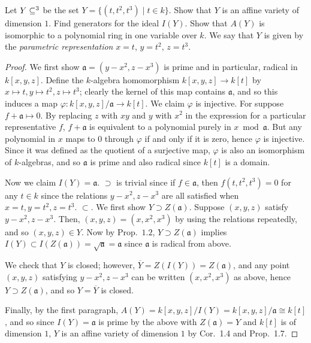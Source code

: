 \documentclass[10pt]{article}
\theoremstyle{definition}
\theoremstyle{remark}
\numberwithin{equation}{section}
\numberwithin{figure}{subsubsection}
\let\AA\relax
\DeclareMathOperator{\AA}{\mathbf{A}}
\begin{document}
\begin{problem}
  Let $Y \subseteq \AA^3$ be the set $Y = \{(t,t^2,t^3) \mid t \in k\}$.
  Show that $Y$ is an affine variety of dimension $1$.
  Find generators for the ideal $I(Y)$.
  Show that $A(Y)$ is isomorphic to a polynomial ring in one variable over $k$.
  We say that $Y$ is given by the \emph{parametric representation} $x =t$,
  $y = t^2$, $z = t^3$.
\end{problem}
\begin{proof}
  We first show $\mathfrak{a} = (y - x^2,z - x^3)$ is prime and in particular,
  radical in $k[x,y,z]$. Define the $k$-algebra homomorphism
  $k[x,y,z] \to k[t]$ by $x \mapsto t,y\mapsto t^2,z \mapsto t^3$; clearly the
  kernel of this map contains $\mathfrak{a}$, and so this induces a map
  $\varphi\colon k[x,y,z]/\mathfrak{a} \to k[t]$.
  We claim $\varphi$ is injective. For suppose $f +\mathfrak{a} \mapsto 0$.
  By replacing $z$ with $xy$ and $y$ with $x^2$ in the expression for a
  particular representative $f$, $f + \mathfrak{a}$ is equivalent to a
  polynomial purely in $x\bmod\mathfrak{a}$.
  But any polynomial in $x$ maps to $0$ through $\varphi$ if and only if it is
  zero, hence $\varphi$ is injective.
  Since it was defined as the quotient of a surjective map, $\varphi$ is also
  an isomorphism of $k$-algebras, and so $\mathfrak{a}$ is prime and also
  radical since $k[t]$ is a domain.
  \par Now we claim $I(Y) = \mathfrak{a}$.
  $\supset$ is trivial since if $f \in \mathfrak{a}$, then $f(t,t^2,t^3) = 0$
  for any $t \in k$ since the relations $y - x^2,z - x^3$ are all satisfied
  when $x=t,y=t^2,z=t^3$.
  $\subset$. We first show $Y \supset Z(\mathfrak{a})$.
  Suppose $(x,y,z)$ satisfy $y - x^2,z - x^3$.
  Then, $(x,y,z) = (x,x^2,x^3)$ by using the relations repeatedly, and so
  $(x,y,z) \in Y$.
  Now by Prop.~$1.2$, $Y \supset Z(\mathfrak{a})$ implies
  $I(Y) \subset I(Z(\mathfrak{a})) = \sqrt{\mathfrak{a}} = \mathfrak{a}$
  since $\mathfrak{a}$ is radical from above. 
  \par We check that $Y$ is closed; however,
  $\overline{Y} = Z(I(Y)) = Z(\mathfrak{a})$, and any point $(x,y,z)$
  satisfying $y - x^2,z - x^3$ can be written $(x,x^2,x^3)$ as above, hence
  $Y \supset Z(\mathfrak{a})$, and so $Y = \overline{Y}$ is closed.
  \par Finally, by the first paragraph,
  $A(Y) = k[x,y,z]/I(Y) = k[x,y,z]/\mathfrak{a} \cong k[t]$, and so since
  $I(Y) = \mathfrak{a}$ is prime by the above with $Z(\mathfrak{a}) = Y$ and
  $k[t]$ is of dimension $1$, $Y$ is an affine variety of dimension $1$ by
  Cor.~1.4 and Prop.~1.7.
\end{proof}
\end{document}
